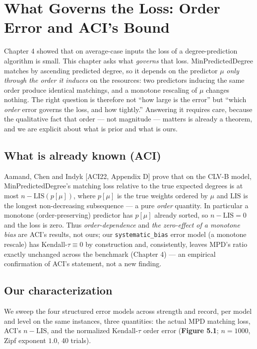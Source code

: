 \chapter{What Governs the Loss: Order Error and ACI's Bound}\label{what-governs-the-loss-order-error-and-acis-bound}

Chapter 4 showed that on average-case inputs the loss of a degree-prediction algorithm is
small. This chapter asks what \emph{governs} that loss. MinPredictedDegree matches by ascending
predicted degree, so it depends on the predictor \(\mu\) \emph{only through the order it induces}
on the resources: two predictors inducing the same order produce identical matchings, and a
monotone rescaling of \(\mu\) changes nothing. The right question is therefore not ``how large
is the error'' but ``which \emph{order} error governs the loss, and how tightly.'' Answering it
requires care, because the qualitative fact that order --- not magnitude --- matters is already
a theorem, and we are explicit about what is prior and what is ours.

\section{What is already known (ACI)}\label{what-is-already-known-aci}

Aamand, Chen and Indyk {[}ACI22, Appendix D{]} prove that on the CLV-B model, MinPredictedDegree's
matching loss relative to the true expected degrees is at most \(n-\mathrm{LIS}(p[\mu])\),
where \(p[\mu]\) is the true weights ordered by \(\mu\) and \(\mathrm{LIS}\) is the longest
non-decreasing subsequence --- a pure \emph{order} quantity. In particular a monotone
(order-preserving) predictor has \(p[\mu]\) already sorted, so \(n-\mathrm{LIS}=0\) and the loss
is zero. Thus \emph{order-dependence} and \emph{the zero-effect of a monotone bias} are ACI's results,
not ours; our \texttt{systematic\_bias} error model (a monotone rescale) has Kendall-\(\tau\equiv0\) by
construction and, consistently, leaves MPD's ratio exactly unchanged across the benchmark
(Chapter 4) --- an empirical confirmation of ACI's statement, not a new finding.

\section{Our characterization}\label{our-characterization}

We sweep the four structured error models across strength and record, per model and level on
the same instances, three quantities: the actual MPD matching loss, ACI's \(n-\mathrm{LIS}\),
and the normalized Kendall-\(\tau\) order error (\textbf{Figure 5.1}; \(n=1000\), Zipf exponent
\(1.0\), 40 trials).

